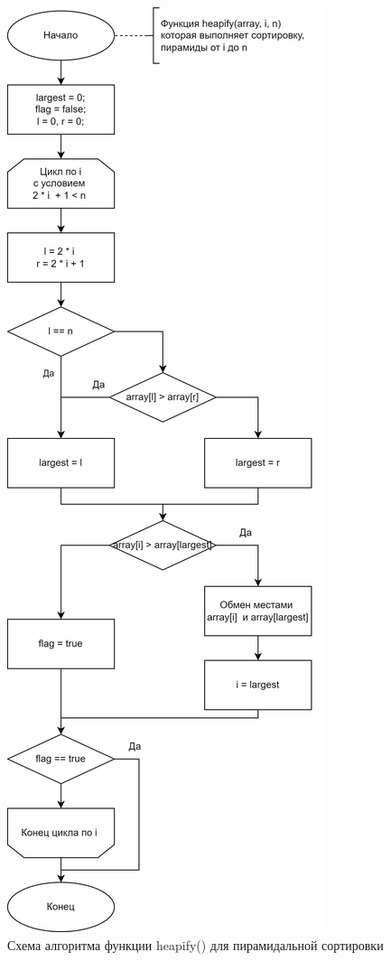 \clearpage

\begin{figure}[h]
	\centering
	\includegraphics[height=0.8\textheight]{img/heap_2.png}
	\caption{Схема алгоритма функции heapify() для пирамидальной сортировки}
	\label{fig:heap_2}
\end{figure}

